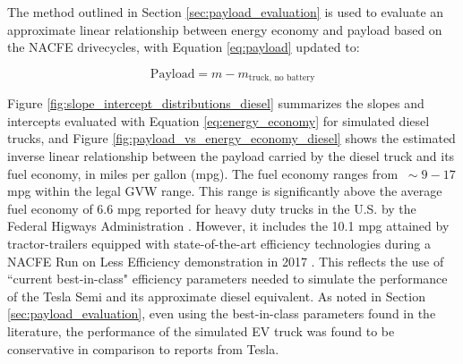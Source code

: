 The method outlined in Section \ref{sec:payload_evaluation} is used to evaluate an approximate linear relationship between energy economy and payload based on the NACFE drivecycles, with Equation \ref{eq:payload} updated to:

\begin{equation}
\label{eq:payload_diesel}
\text{Payload} = m - m_\text{truck, no battery}
\end{equation}

Figure \ref{fig:slope_intercept_distributions_diesel} summarizes the slopes and intercepts evaluated with Equation \ref{eq:energy_economy} for simulated diesel trucks, and Figure \ref{fig:payload_vs_energy_economy_diesel} shows the estimated inverse linear relationship between the payload carried by the diesel truck and its fuel economy, in miles per gallon (mpg). The fuel economy ranges from  $~\sim9-17$ mpg within the legal GVW range. This range is significantly above the average fuel economy of 6.6 mpg reported for heavy duty trucks in the U.S. by the Federal Higways Administration \cite{fhwa_2018}. However, it includes the 10.1 mpg attained by tractor-trailers equipped with state-of-the-art efficiency technologies during a NACFE Run on Less Efficiency demonstration in 2017 \cite{nacfe_run_2017}. This reflects the use of ``current best-in-class" efficiency parameters needed to simulate the performance of the Tesla Semi and its approximate diesel equivalent. As noted in Section \ref{sec:payload_evaluation}, even using the best-in-class parameters found in the literature, the performance of the simulated EV truck was found to be conservative in comparison to reports from Tesla. 

